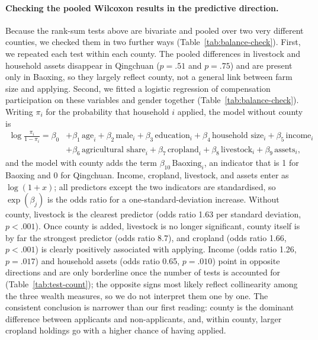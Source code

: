 \paragraph{Checking the pooled Wilcoxon results in the predictive direction.}
Because the rank-sum tests above are bivariate and pooled over two very
different counties, we checked them in two further ways
(Table~\ref{tab:balance-check}). First, we repeated each test within each
county. The pooled differences in livestock and household assets disappear
in Qingchuan ($p = .51$ and $p = .75$) and are present only in Baoxing, so
they largely reflect county, not a general link between farm size and
applying. Second, we fitted a logistic regression of compensation
participation on these variables and gender together
(Table~\ref{tab:balance-check}). Writing $\pi_i$ for the probability that
household $i$ applied, the model without county is
\begin{equation}
\begin{split}
\log\frac{\pi_i}{1-\pi_i} = \beta_0 &+ \beta_1\,\text{age}_i + \beta_2\,\text{male}_i
 + \beta_3\,\text{education}_i + \beta_4\,\text{household size}_i
 + \beta_5\,\text{income}_i \\ &+ \beta_6\,\text{agricultural share}_i
 + \beta_7\,\text{cropland}_i + \beta_8\,\text{livestock}_i
 + \beta_9\,\text{assets}_i ,
\end{split}
\label{eq:logit}
\end{equation}
and the model with county adds the term $\beta_{10}\,\text{Baoxing}_i$,
an indicator that is 1 for Baoxing and 0 for Qingchuan. Income, cropland,
livestock, and assets enter as $\log(1+x)$; all predictors except the two
indicators are standardised, so $\exp(\beta_j)$ is the odds ratio for a
one-standard-deviation increase.
Without county, livestock is the clearest predictor (odds ratio 1.63 per
standard deviation, $p < .001$). Once county is added, livestock is no longer
significant, county itself is by far the strongest predictor (odds ratio 8.7),
and cropland (odds ratio 1.66, $p < .001$) is clearly positively associated
with applying. Income (odds ratio 1.26, $p = .017$) and household assets
(odds ratio 0.65, $p = .010$) point in opposite directions and are only
borderline once the number of tests is accounted for (Table~\ref{tab:test-count});
the opposite signs most likely reflect collinearity among the three wealth
measures, so we do not interpret them one by one. The consistent
conclusion is narrower than our first reading: county is the dominant
difference between applicants and non-applicants, and, within county, larger
cropland holdings go with a higher chance of having applied.


